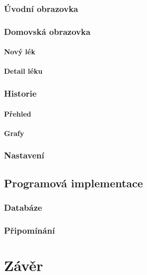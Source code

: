 \documentclass[a4paper,12pt]{report}
\begin{document}
\subsection{Úvodní obrazovka}
\subsection{Domovská obrazovka}
\subsubsection{Nový lék}
\subsubsection{Detail léku}
\subsection{Historie}
\subsubsection{Přehled}
\subsubsection{Grafy}
\subsection{Nastavení}
\section{Programová implementace}
\subsection{Databáze}
\subsection{Připomínání}

\chapter*{Závěr}
\end{document}
